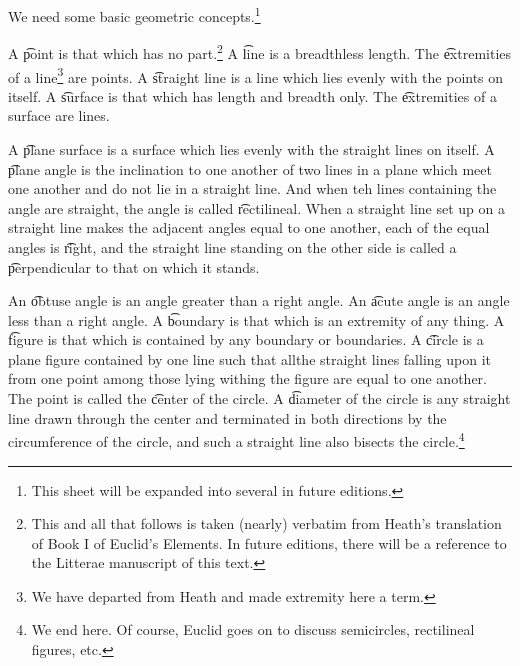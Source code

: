 

We need some basic geometric concepts.\footnote{This sheet will be expanded into several in future editions.}


A \t{point} is that which has no part.\footnote{This and all that follows is taken (nearly) verbatim from Heath's translation of Book I of Euclid's Elements. In future editions, there will be a reference to the Litterae manuscript of this text.}
A \t{line} is a breadthless length.
The \t{extremities of a line}\footnote{We have departed from Heath and made extremity here a term.} are points.
A \t{straight line} is a line which lies evenly with the points on itself.
A \t{surface} is that which has length and breadth only.
The \t{extremities of a surface} are lines.

A \t{plane surface} is a surface which lies evenly with the straight lines on itself.
A \t{plane angle} is the inclination to one another of two lines in a plane which meet one another and do not lie in a straight line.
And when teh lines containing the angle are straight, the angle is called \t{rectilineal}.
  When a straight line set up on a straight line makes the adjacent angles equal to one another, each of the equal angles is \t{right}, and the straight line standing on the other side is called a \t{perpendicular} to that on which it stands.

  An \t{obtuse angle} is an angle greater than a right angle.
  An \t{acute angle} is an angle less than a right angle.
  A \t{boundary} is that which is an extremity of any thing.
  A \t{figure} is that which is contained by any boundary or boundaries.
  A \t{circle} is a plane figure contained by one line such that allthe straight lines falling upon it from one point among those lying withing the figure are equal to one another.
  The point is called the \t{center} of the circle.
  A \t{diameter} of the circle is any straight line drawn through the center and terminated in both directions by the circumference of the circle, and such a straight line also bisects the circle.\footnote{We end here. Of course, Euclid goes on to discuss semicircles, rectilineal figures, etc.}
